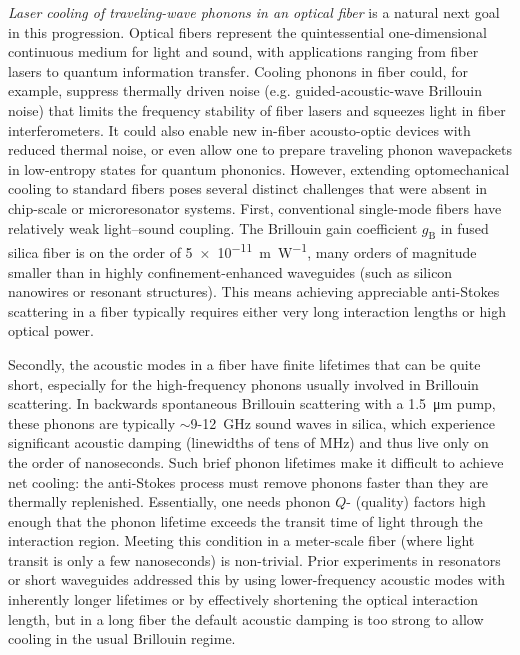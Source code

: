 \textit{Laser cooling of traveling-wave phonons in an optical fiber} is a natural next goal in this progression. Optical fibers represent the quintessential one-dimensional continuous medium for light and sound, with applications ranging from fiber lasers to quantum information transfer. Cooling phonons in fiber could, for example, suppress thermally driven noise (e.g. guided-acoustic-wave Brillouin noise) that limits the frequency stability of fiber lasers and squeezes light in fiber interferometers. \cite{shin2015control} It could also enable new in-fiber acousto-optic devices with reduced thermal noise, or even allow one to prepare traveling phonon wavepackets in low-entropy states for quantum phononics. However, extending optomechanical cooling to standard fibers poses several distinct challenges that were absent in chip-scale or microresonator systems. First, conventional single-mode fibers have relatively weak light–sound coupling. The Brillouin gain coefficient \(g_{\mathrm{B}}\) in fused silica fiber is on the order of \SI{5e-11}{\meter\per\watt},\cite{abedin2005observation, vysloukh1990nonlinear} many orders of magnitude smaller than in highly confinement-enhanced waveguides (such as silicon nanowires or resonant structures). This means achieving appreciable anti-Stokes scattering in a fiber typically requires either very long interaction lengths or high optical power.

Secondly, the acoustic modes in a fiber have finite lifetimes that can be quite short, especially for the high-frequency phonons usually involved in Brillouin scattering. In backwards spontaneous Brillouin scattering with a \SI{1.5}{\micro\meter} pump, these phonons are typically \(\sim\)9-\SI{12}{\giga\hertz} sound waves in silica, which experience significant acoustic damping (linewidths of tens of \si{\mega\hertz}) and thus live only on the order of nanoseconds. \cite{endo2021coherent} Such brief phonon lifetimes make it difficult to achieve net cooling: the anti-Stokes process must remove phonons faster than they are thermally replenished. Essentially, one needs phonon \(Q\)- (quality) factors high enough that the phonon lifetime exceeds the transit time of light through the interaction region. Meeting this condition in a meter-scale fiber (where light transit is only a few nanoseconds) is non-trivial. Prior experiments in resonators or short waveguides addressed this by using lower-frequency acoustic modes with inherently longer lifetimes\cite{bahl2012observation} or by effectively shortening the optical interaction length, but in a long fiber the default acoustic damping is too strong to allow cooling in the usual Brillouin regime.

